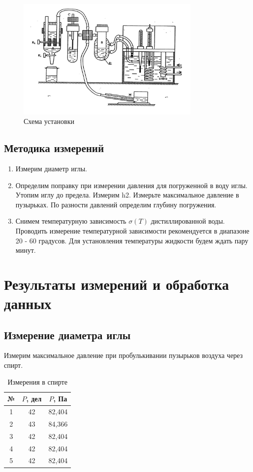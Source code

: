 \documentclass[a4paper,12pt]{article}
\begin{document}
\begin{figure}[H]
    \begin{center}
    \includegraphics[width=0.8\textwidth]{Установка}
    \end{center}
    \caption{Схема установки}
\end{figure}

\subsection*{Методика измерений}
\begin{enumerate}
    \item Измерим диаметр иглы. 
    \item Определим поправку при измерении давления для погруженной в воду иглы. Утопим иглу до предела. Измерим h2. Измерьте максимальное давление в пузырьках. По разности давлений определим глубину погружения.
    \item Снимем температурную зависимость $\sigma (T)$ дистиллированной воды. Проводить измерение температурной зависимости рекомендуется в диапазоне 20 - 60 градусов. Для установления температуры жидкости будем ждать пару минут. 
\end{enumerate}

\section{Результаты измерений и обработка данных}

\subsection*{Измерение диаметра иглы}
Измерим максимальное давление при пробулькивании пузырьков воздуха через спирт. 

\begin{table}[H]
    \centering
    \begin{tabular}{|c|c|c|}
    \hline
        № & $P$, дел & $P$, Па  \\ \hline
        1 & 42 & 82,404 \\ \hline
        2 & 43 & 84,366 \\ \hline
        3 & 42 & 82,404 \\ \hline
        4 & 42 & 82,404 \\ \hline
        5 & 42 & 82,404 \\ \hline
    \end{tabular}
    \caption{Измерения в спирте}
\end{table}
\end{document}
